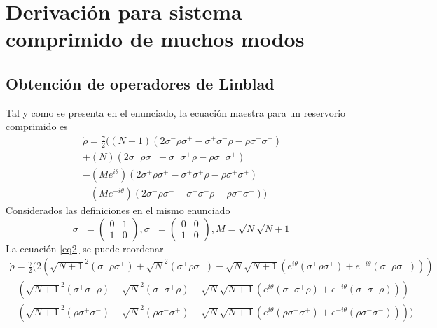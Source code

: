 \documentclass{book}
\begin{document}
\section{Derivación para sistema comprimido de muchos modos}
\subsection{{Obtención de operadores de Linblad}}
Tal y como se presenta en el enunciado, la ecuación maestra para un reservorio comprimido es
\begin{equation}\label{eq2}\begin{aligned} {\dot{\rho}=\frac{\gamma}{2}((N+1)(2\sigma^-\rho\sigma^+-\sigma^+\sigma^-\rho-\rho\sigma^+\sigma^-)}\\ {+(N)(2\sigma^+\rho\sigma^--\sigma^-\sigma^+\rho-\rho\sigma^-\sigma^+)} \\ {-(Me^{i\theta})(2\sigma^+\rho\sigma^+-\sigma^+\sigma^+\rho-\rho\sigma^+\sigma^+)}\\
{-(Me^{-i\theta})(2\sigma^-\rho\sigma^--\sigma^-\sigma^-\rho-\rho\sigma^-\sigma^-))}\end{aligned}\end{equation}
Considerados las definiciones en el mismo enunciado
\begin{equation}\label{eq2.a} {\sigma^+=\begin{pmatrix} 0&1\\ 1&0\end{pmatrix}, \sigma^-=\begin{pmatrix}0&0\\1&0\end{pmatrix},  M=\sqrt{N}\sqrt{N+1}}\end{equation}
La ecuación \ref{eq2} se puede reordenar
\begin{equation}\label{eq2.b}\begin{aligned} {\dot{\rho}=\frac{\gamma}{2}(2(\sqrt{N+1}^2(\sigma^-\rho\sigma^+)+\sqrt{N}^2(\sigma^+\rho\sigma^-)-\sqrt{N}\sqrt{N+1}(e^{i\theta}(\sigma^+\rho\sigma^+)+e^{-i\theta}(\sigma^-\rho\sigma^-)))}\\ {-(\sqrt{N+1}^2(\sigma^+\sigma^-\rho)+\sqrt{N}^2(\sigma^-\sigma^+\rho)-\sqrt{N}\sqrt{N+1}(e^{i\theta}(\sigma^+\sigma^+\rho)+e^{-i\theta}(\sigma^-\sigma^-\rho)))} \\ {-(\sqrt{N+1}^2(\rho\sigma^+\sigma^-)+\sqrt{N}^2(\rho\sigma^-\sigma^+)-\sqrt{N}\sqrt{N+1}(e^{i\theta}(\rho\sigma^+\sigma^+)+e^{-i\theta}(\rho\sigma^-\sigma^-))))}\\ \end{aligned}\end{equation}
\end{document}
